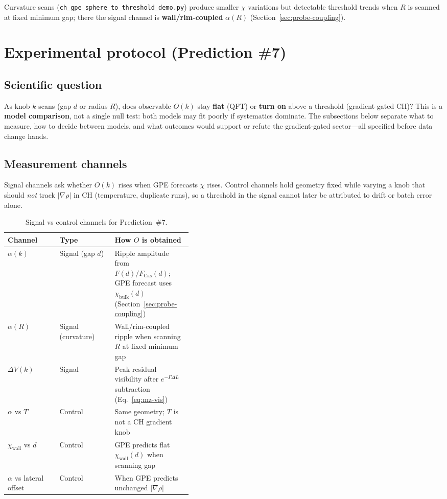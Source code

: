 \documentclass[11pt,a4paper]{article}
\begin{document}
Curvature scans (\texttt{ch\_gpe\_sphere\_to\_threshold\_demo.py}) produce smaller $\chi$ variations but detectable threshold trends when $R$ is scanned at fixed minimum gap; there the signal channel is \textbf{wall/rim-coupled} $\alpha(R)$ (Section~\ref{sec:probe-coupling}).

\section{Experimental protocol (Prediction \#7)}
\label{sec:protocol}

\subsection{Scientific question}

As knob $k$ scans (gap $d$ or radius $R$), does observable $O(k)$ stay \textbf{flat} (QFT) or \textbf{turn on} above a threshold (gradient-gated CH)?
This is a \textbf{model comparison}, not a single null test: both models may fit poorly if systematics dominate.
The subsections below separate what to measure, how to decide between models, and what outcomes would support or refute the gradient-gated sector---all specified before data change hands.

\subsection{Measurement channels}

Signal channels ask whether $O(k)$ rises when GPE forecasts $\chi$ rises.
Control channels hold geometry fixed while varying a knob that should \emph{not} track $|\nabla\rho|$ in CH (temperature, duplicate runs), so a threshold in the signal cannot later be attributed to drift or batch error alone.

\begin{table}[htbp]
  \centering
  \caption{Signal vs control channels for Prediction~\#7.}
  \label{tab:channels}
  \small
  \begin{tabular}{@{}llp{0.42\linewidth}@{}}
    \toprule
    Channel & Type & How $O$ is obtained \\
    \midrule
    $\alpha(k)$ & Signal (gap $d$) & Ripple amplitude from $F(d)/F_{\mathrm{Cas}}(d)$; GPE forecast uses $\chi_{\mathrm{bulk}}(d)$ (Section~\ref{sec:probe-coupling}) \\
    $\alpha(R)$ & Signal (curvature) & Wall/rim-coupled ripple when scanning $R$ at fixed minimum gap \\
    $\Delta V(k)$ & Signal & Peak residual visibility after $e^{-\Gamma\Delta L}$ subtraction (Eq.~\ref{eq:mz-vis}) \\
    $\alpha$ vs $T$ & Control & Same geometry; $T$ is not a CH gradient knob \\
    $\chi_{\mathrm{wall}}$ vs $d$ & Control & GPE predicts flat $\chi_{\mathrm{wall}}(d)$ when scanning gap \\
    $\alpha$ vs lateral offset & Control & When GPE predicts unchanged $|\nabla\rho|$ \\
    \bottomrule
  \end{tabular}
\end{table}
\end{document}

